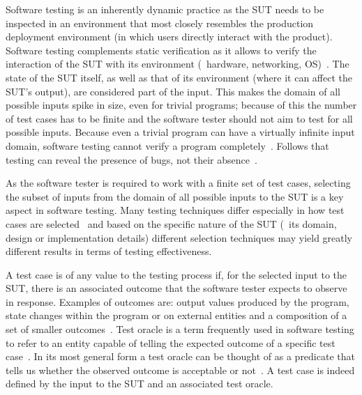 Software testing is an inherently dynamic practice as the \ac{SUT} needs to be
inspected in an environment that most closely resembles the production
deployment environment (in which users directly interact with the product).
Software testing complements static verification as it allows to verify the
interaction of the \ac{SUT} with its environment (\eg~hardware, networking,
\ac{OS})~\cite{ammann2016introduction}. The state of the \ac{SUT} itself, as
well as that of its environment (where it can affect the \ac{SUT}'s output), are
considered part of the input.  This makes the domain of all possible inputs
spike in size, even for trivial programs; because of this the number of test
cases has to be finite and the software tester should not aim to test for all
possible inputs. Because even a trivial program can have a virtually infinite
input domain, software testing cannot verify a program
completely~\cite{kaner2000testing}. Follows that testing can reveal the presence
of bugs, not their absence~\cite{buxton1970software,dijkstra1970notes}.

As the software tester is required to work with a finite set of test cases,
selecting the subset of inputs from the domain of all possible inputs to the
\ac{SUT} is a key aspect in software testing. Many testing techniques differ
especially in how test cases are selected~\cite{naik2011software} and based on
the specific nature of the \ac{SUT} (\eg~its domain, design or implementation
details) different selection techniques may yield greatly different results in
terms of testing effectiveness.

A test case is of any value to the testing process if, for the selected input to
the \ac{SUT}, there is an associated outcome that the software tester expects to
observe in response. Examples of outcomes are: output values produced by the
program, state changes within the program or on external entities and a
composition of a set of smaller outcomes~\cite{naik2011software}. Test oracle is
a term frequently used in software testing to refer to an entity capable of
telling the expected outcome of a specific test
case~\cite{howden1978theoretical}. In its most general form a test oracle can be
thought of as a predicate that tells us whether the observed outcome is
acceptable or not~\cite{barr2015oracle}. A test case is indeed defined by the
input to the \ac{SUT} and an associated test oracle.


